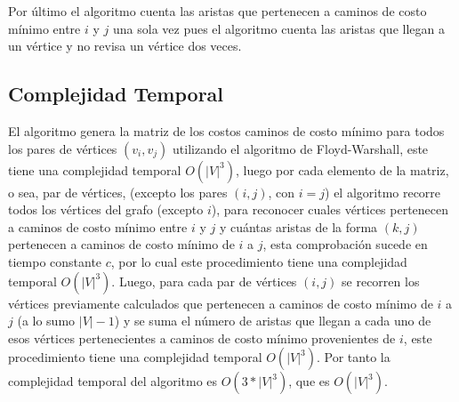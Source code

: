 \documentclass[article]{llncs}
\begin{document}
Por \'ultimo el algoritmo cuenta las aristas que pertenecen a caminos de costo m\'inimo entre $i$ y $j$ una sola vez pues el algoritmo cuenta las aristas 
que llegan a un v\'ertice y no revisa un v\'ertice dos veces.


\subsection{Complejidad Temporal}

El algoritmo genera la matriz de los costos caminos de costo mínimo para todos los pares de vértices $(v_i,v_j)$ utilizando el algoritmo
de Floyd-Warshall, este tiene una complejidad temporal $O(|V|^3)$, luego por cada elemento de la matriz, o sea, par de vértices, (excepto los pares $(i,j)$, con $i=j$)
el algoritmo recorre todos los vértices del grafo (excepto $i$), para reconocer cuales vértices pertenecen a caminos de costo mínimo entre $i$ y $j$ y cuántas aristas de la forma $(k,j)$ pertenecen
 a caminos de costo mínimo de $i$ a $j$, esta comprobación sucede en tiempo constante $c$, por lo cual este procedimiento tiene una complejidad temporal $O(|V|^3)$. Luego, para cada par de vértices $(i,j)$ se recorren los vértices previamente calculados
 que pertenecen a caminos de costo mínimo de $i$ a $j$ (a lo sumo $|V|-1$) y se suma el número de aristas que llegan a cada uno de esos vértices pertenecientes a caminos de costo mínimo provenientes de $i$, este procedimiento tiene una complejidad temporal $O(|V|^3)$.
 Por tanto la complejidad temporal del algoritmo es $O(3*|V|^3)$, que es $O(|V|^3)$.
\end{document}
